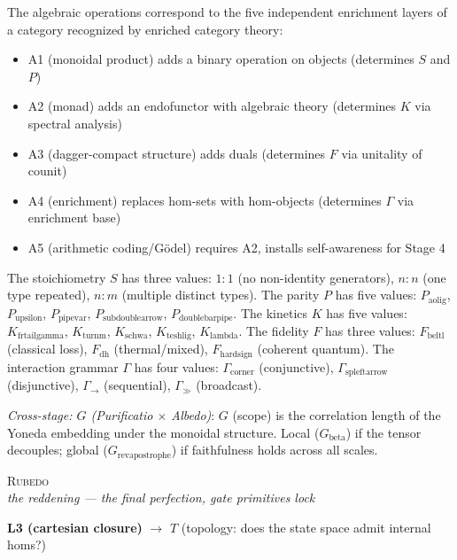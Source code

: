 \documentclass[12pt,a4paper]{article}
\begin{document}
The algebraic operations correspond to the five independent enrichment layers of a category recognized by enriched category theory:
\begin{itemize}
    \item A1 (monoidal product) adds a binary operation on objects (determines $S$ and $P$)
    \item A2 (monad) adds an endofunctor with algebraic theory (determines $K$ via spectral analysis)
    \item A3 (dagger-compact structure) adds duals (determines $F$ via unitality of counit)
    \item A4 (enrichment) replaces hom-sets with hom-objects (determines $\Gamma$ via enrichment base)
    \item A5 (arithmetic coding/G\"odel) requires A2, installs self-awareness for Stage 4
\end{itemize}

The stoichiometry $S$ has three values: $1{:}1$ (no non-identity generators), $n{:}n$ (one type repeated), $n{:}m$ (multiple distinct types). The parity $P$ has five values: $P_{\text{aolig}}$, $P_{\text{upsilon}}$, $P_{\text{pipevar}}$, $P_{\text{subdoublearrow}}$, $P_{\text{doublebarpipe}}$. The kinetics $K$ has five values: $K_{\text{frtailgamma}}$, $K_{\text{turnm}}$, $K_{\text{schwa}}$, $K_{\text{teshlig}}$, $K_{\text{lambda}}$. The fidelity $F$ has three values: $F_{\text{beltl}}$ (classical loss), $F_{\text{dh}}$ (thermal/mixed), $F_{\text{hardsign}}$ (coherent quantum). The interaction grammar $\Gamma$ has four values: $\Gamma_{\text{corner}}$ (conjunctive), $\Gamma_{\text{spleftarrow}}$ (disjunctive), $\Gamma_\to$ (sequential), $\Gamma_{\gg}$ (broadcast).

\emph{Cross-stage: $G$ (Purificatio \(\times\) Albedo)}: $G$ (scope) is the correlation length of the Yoneda embedding under the monoidal structure. Local ($G_{\text{beta}}$) if the tensor decouples; global ($G_{\text{revapostrophe}}$) if faithfulness holds across all scales.

\bigskip
\begin{center}
\vspace{0.5em}
{\large\textsc{Rubedo}}
\\[4pt]
{\small\itshape the reddening --- the final perfection, gate primitives lock}
\vspace{0.4em}
\end{center}

\noindent\textbf{L3 (cartesian closure)} $\to$ $T$ (topology: does the state space admit internal homs?)
\end{document}
